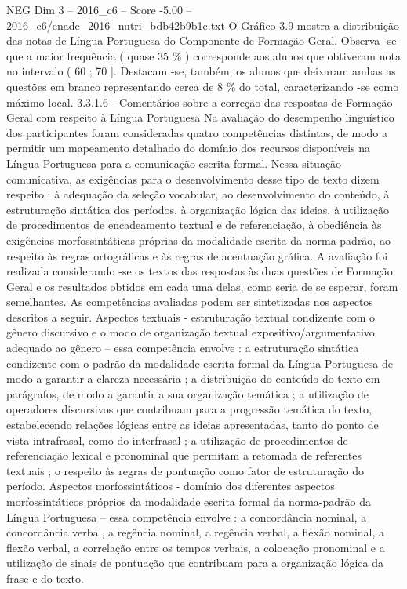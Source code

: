 \begin{textsample}{NEG Dim 3 – 2016\_c6 – Score -5.00 – 2016\_c6/enade\_2016\_nutri\_bdb42b9b1c.txt}
O Gráfico 3.9 mostra a distribuição das notas de Língua Portuguesa do Componente de Formação Geral.
Observa -se que a maior frequência ( quase 35 \% ) corresponde aos alunos que obtiveram nota no intervalo ( 60 ; 70 ].
Destacam -se, também, os alunos que deixaram ambas as questões em branco representando cerca de 8 \% do total, caracterizando -se como máximo local. 3.3.1.6 - Comentários sobre a correção das respostas de Formação Geral com respeito à Língua Portuguesa Na avaliação do desempenho linguístico dos participantes foram consideradas quatro competências distintas, de modo a permitir um mapeamento detalhado do domínio dos recursos disponíveis na Língua Portuguesa para a comunicação escrita formal.
Nessa situação comunicativa, as exigências para o desenvolvimento desse tipo de texto dizem respeito : à adequação da seleção vocabular, ao desenvolvimento do conteúdo, à estruturação sintática dos períodos, à organização lógica das ideias, à utilização de procedimentos de encadeamento textual e de referenciação, à obediência às exigências morfossintáticas próprias da modalidade escrita da norma-padrão, ao respeito às regras ortográficas e às regras de acentuação gráfica.
A avaliação foi realizada considerando -se os textos das respostas às duas questões de Formação Geral e os resultados obtidos em cada uma delas, como seria de se esperar, foram semelhantes.
As competências avaliadas podem ser sintetizadas nos aspectos descritos a seguir.
Aspectos textuais - estruturação textual condizente com o gênero discursivo e o modo de organização textual expositivo/argumentativo adequado ao gênero – essa competência envolve : a estruturação sintática condizente com o padrão da modalidade escrita formal da Língua Portuguesa de modo a garantir a clareza necessária ; a distribuição do conteúdo do texto em parágrafos, de modo a garantir a sua organização temática ; a utilização de operadores discursivos que contribuam para a progressão temática do texto, estabelecendo relações lógicas entre as ideias apresentadas, tanto do ponto de vista intrafrasal, como do interfrasal ; a utilização de procedimentos de referenciação lexical e pronominal que permitam a retomada de referentes textuais ; o respeito às regras de pontuação como fator de estruturação do período.
Aspectos morfossintáticos - domínio dos diferentes aspectos morfossintáticos próprios da modalidade escrita formal da norma-padrão da Língua Portuguesa – essa competência envolve : a concordância nominal, a concordância verbal, a regência nominal, a regência verbal, a flexão nominal, a flexão verbal, a correlação entre os tempos verbais, a colocação pronominal e a utilização de sinais de pontuação que contribuam para a organização lógica da frase e do texto.

\end{textsample}
